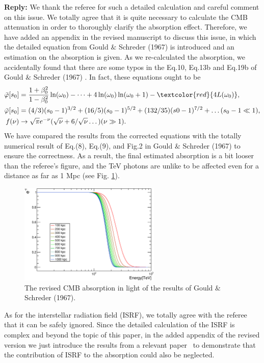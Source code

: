 \documentclass{article}
\begin{document}
\textbf{Reply:} We thank the referee for such a detailed calculation and careful comment on this issue. We totally agree that it is quite necessary to calculate the CMB attenuation in order to thoroughly clarify the absorption effect. Therefore, we have added an appendix in the revised manuscript to discuss this issue, in which the detailed equation from Gould $\&$ Schreder (1967) \cite{Gould:1967zzb} is introduced and an estimation on the absorption is given. As we re-calculated the absorption, we accidentally found that there are some typos in the Eq.10, Eq.13b and Eq.19b of Gould $\&$ Schreder (1967) \cite{Gould:1967zzb}. In fact, these equations ought to be
\begin{align*}
  \bar{\varphi}[s_0]&=\frac{1+\beta_0^2}{1-\beta_0^2}\ln(\omega_0) - \dots + 4\ln(\omega_0)\ln(\omega_0+1) - \textcolor{red}{4L(\omega_0)},\\
  \bar{\varphi}[s_0]&=(4/3)(s_0-1)^{3/2} + (16/5)(s_0-1)^{5/2} + (132/35)(s0 - 1)^{7/2} + \dots (s_0-1\ll1),\\
  f(\nu)&\rightarrow\sqrt{\pi}e^{-\nu}(\sqrt{\nu}+6/\sqrt{\nu}\dots) (\nu\gg1).
\end{align*}
We have compared the results from the corrected equations with the totally numerical result of Eq.(8), Eq.(9), and Fig.2 in Gould $\&$ Schreder (1967) to ensure the correctness.
As a result, the final estimated absorption is a bit looser than the referee's figure, and the TeV photons are unlike to be affected even for a distance as far as 1 Mpc (see Fig. \ref{op}).
\begin{figure}[htbp]
  \centering
  \includegraphics[width=0.60\textwidth]{figs/opacity.eps}
  \caption{The revised CMB absorption in light of the results of Gould $\&$ Schreder (1967).}
  \label{op}
\end{figure}

As for the interstellar radiation field (ISRF), we totally agree with the referee that it can be safely ignored.
Since the detailed calculation of the ISRF is complex and beyond the topic of this paper, in the added appendix of the revised version we just introduce the results from a relevant paper~\cite{Zhang:2005tp} to demonstrate that the contribution of ISRF to the absorption could also be neglected.
\end{document}
